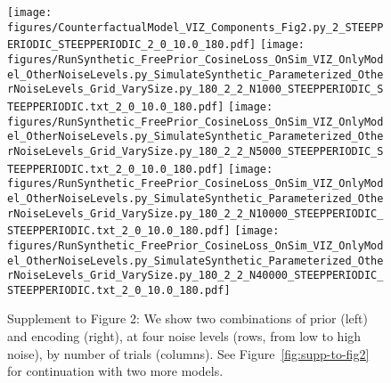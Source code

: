 \documentclass{article}
\begin{document}
\begin{figure}
\texttt{[image: figures/CounterfactualModel\_VIZ\_Components\_Fig2.py\_2\_STEEPPERIODIC\_STEEPPERIODIC\_2\_0\_10.0\_180.pdf]}
\texttt{[image: figures/RunSynthetic\_FreePrior\_CosineLoss\_OnSim\_VIZ\_OnlyModel\_OtherNoiseLevels.py\_SimulateSynthetic\_Parameterized\_OtherNoiseLevels\_Grid\_VarySize.py\_180\_2\_2\_N1000\_STEEPPERIODIC\_STEEPPERIODIC.txt\_2\_0\_10.0\_180.pdf]}
\texttt{[image: figures/RunSynthetic\_FreePrior\_CosineLoss\_OnSim\_VIZ\_OnlyModel\_OtherNoiseLevels.py\_SimulateSynthetic\_Parameterized\_OtherNoiseLevels\_Grid\_VarySize.py\_180\_2\_2\_N5000\_STEEPPERIODIC\_STEEPPERIODIC.txt\_2\_0\_10.0\_180.pdf]}
\texttt{[image: figures/RunSynthetic\_FreePrior\_CosineLoss\_OnSim\_VIZ\_OnlyModel\_OtherNoiseLevels.py\_SimulateSynthetic\_Parameterized\_OtherNoiseLevels\_Grid\_VarySize.py\_180\_2\_2\_N10000\_STEEPPERIODIC\_STEEPPERIODIC.txt\_2\_0\_10.0\_180.pdf]}
\texttt{[image: figures/RunSynthetic\_FreePrior\_CosineLoss\_OnSim\_VIZ\_OnlyModel\_OtherNoiseLevels.py\_SimulateSynthetic\_Parameterized\_OtherNoiseLevels\_Grid\_VarySize.py\_180\_2\_2\_N40000\_STEEPPERIODIC\_STEEPPERIODIC.txt\_2\_0\_10.0\_180.pdf]}



\caption{Supplement to Figure 2: We show two combinations of prior (left) and encoding (right), at four noise levels (rows, from low to high noise), by number of trials (columns). See Figure~\ref{fig:supp-to-fig2} for continuation with two more models.}
\end{figure}
\end{document}
